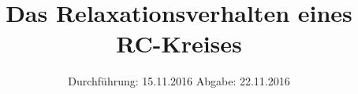 

\subject{V353}
\title{Das Relaxationsverhalten eines RC-Kreises}
\date{
	Durchführung: 15.11.2016
	\hspace{4em}
	Abgabe: 22.11.2016
}


	\maketitle
	\newpage
	\tableofcontents
	\newpage
	
	
	
	
	
	\newpage
	
	\printbibliography

